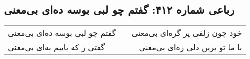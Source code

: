 \begin{center}
\section*{رباعی شماره ۴۱۲: گفتم چو لبی بوسه ده‌ای بی‌معنی}
\label{sec:sh412}
\begin{longtable}{l p{0.5cm} r}
گفتم چو لبی بوسه ده‌ای بی‌معنی
&&
خود چون زلفی پر گره‌ای بی‌معنی
\\
گفتی ز که یابیم به‌ای بی‌معنی
&&
با ما تو برین دلی زه‌ای بی‌معنی
\\
\end{longtable}
\end{center}
